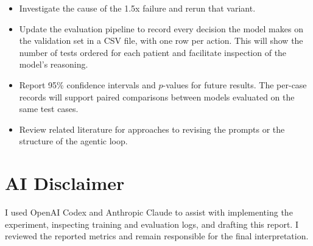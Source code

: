 \documentclass[11pt]{article}
\begin{document}
\begin{itemize}
  \item Investigate the cause of the 1.5x failure and rerun that variant.
  \item Update the evaluation pipeline to record every decision the model makes
        on the validation set in a CSV file, with one row per action. This will
        show the number of tests ordered for each patient and facilitate
        inspection of the model's reasoning.
  \item Report 95\% confidence intervals and $p$-values for future results.
        The per-case records will support paired comparisons between models
        evaluated on the same test cases.
  \item Review related literature for approaches to revising the prompts or
        the structure of the agentic loop.
\end{itemize}

\section{AI Disclaimer}

I used OpenAI Codex and Anthropic Claude to assist with implementing the
experiment, inspecting training and evaluation logs, and drafting this report.
I reviewed the reported metrics and remain responsible for the final
interpretation.
\end{document}
